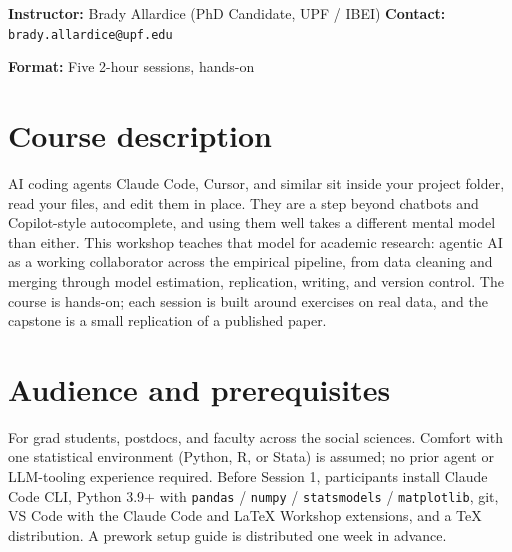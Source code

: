 \documentclass[11pt]{article}
\begin{document}
\thispagestyle{fancy}

\noindent{\color{redesteal}\rule{\linewidth}{1.5pt}}\par
\vspace{0.5em}
\vspace{0.3em}
\vspace{0.6em}
\noindent\textbf{Instructor:} Brady Allardice (PhD Candidate, UPF / IBEI) \quad \textbf{Contact:} \texttt{brady.allardice@upf.edu}\par
\vspace{0.2em}
\noindent\textbf{Format:} Five 2-hour sessions, hands-on\par
\vspace{0.5em}
\noindent{\color{redesteal}\rule{\linewidth}{0.5pt}}\par
\vspace{1.4em}

\section*{Course description}

AI coding agents \textemdash{} Claude Code, Cursor, and similar \textemdash{} sit inside your project folder, read your files, and edit them in place. They are a step beyond chatbots and Copilot-style autocomplete, and using them well takes a different mental model than either. This workshop teaches that model for academic research: agentic AI as a working collaborator across the empirical pipeline, from data cleaning and merging through model estimation, replication, writing, and version control. The course is hands-on; each session is built around exercises on real data, and the capstone is a small replication of a published paper.

\section*{Audience and prerequisites}

For grad students, postdocs, and faculty across the social sciences. Comfort with one statistical environment (Python, R, or Stata) is assumed; no prior agent or LLM-tooling experience required. Before Session 1, participants install Claude Code CLI, Python 3.9+ with \texttt{pandas} / \texttt{numpy} / \texttt{statsmodels} / \texttt{matplotlib}, git, VS Code with the Claude Code and LaTeX Workshop extensions, and a TeX distribution. A prework setup guide is distributed one week in advance.
\end{document}

